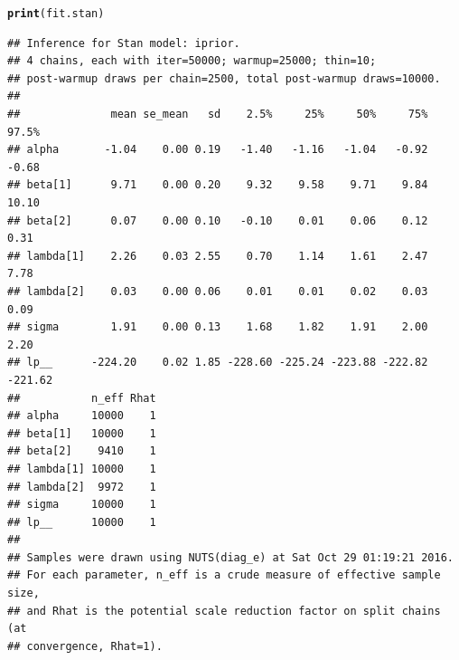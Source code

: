 \documentclass[]{beamer}\usepackage[]{graphicx}\usepackage[]{color}
\makeatletter
\newcommand{\hlstd}[1]{\textcolor[rgb]{0.345,0.345,0.345}{#1}}%
\newcommand{\hlkwd}[1]{\textcolor[rgb]{0.737,0.353,0.396}{\textbf{#1}}}%
\newenvironment{kframe}{%
 \def\at@end@of@kframe{}%
 \ifinner\ifhmode%
  \def\at@end@of@kframe{\end{minipage}}%
  \begin{minipage}{\columnwidth}%
 \fi\fi%
 \def\FrameCommand##1{\hskip\@totalleftmargin \hskip-\fboxsep
 \colorbox{shadecolor}{##1}\hskip-\fboxsep
     \hskip-\linewidth \hskip-\@totalleftmargin \hskip\columnwidth}%
 \MakeFramed {\advance\hsize-\width
   \@totalleftmargin\z@ \linewidth\hsize
   \@setminipage}}%
 {\par\unskip\endMakeFramed%
 \at@end@of@kframe}
\newenvironment{knitrout}{}{} %
\makeatother
\begin{document}
\newsavebox{\stanres}
\begin{lrbox}{\stanres}
\begin{knitrout}\footnotesize
{}\color{fgcolor}\begin{kframe}
\begin{alltt}
\hlkwd{print}\hlstd{(fit.stan)}
\end{alltt}
\begin{verbatim}
## Inference for Stan model: iprior.
## 4 chains, each with iter=50000; warmup=25000; thin=10; 
## post-warmup draws per chain=2500, total post-warmup draws=10000.
## 
##              mean se_mean   sd    2.5%     25%     50%     75%   97.5%
## alpha       -1.04    0.00 0.19   -1.40   -1.16   -1.04   -0.92   -0.68
## beta[1]      9.71    0.00 0.20    9.32    9.58    9.71    9.84   10.10
## beta[2]      0.07    0.00 0.10   -0.10    0.01    0.06    0.12    0.31
## lambda[1]    2.26    0.03 2.55    0.70    1.14    1.61    2.47    7.78
## lambda[2]    0.03    0.00 0.06    0.01    0.01    0.02    0.03    0.09
## sigma        1.91    0.00 0.13    1.68    1.82    1.91    2.00    2.20
## lp__      -224.20    0.02 1.85 -228.60 -225.24 -223.88 -222.82 -221.62
##           n_eff Rhat
## alpha     10000    1
## beta[1]   10000    1
## beta[2]    9410    1
## lambda[1] 10000    1
## lambda[2]  9972    1
## sigma     10000    1
## lp__      10000    1
## 
## Samples were drawn using NUTS(diag_e) at Sat Oct 29 01:19:21 2016.
## For each parameter, n_eff is a crude measure of effective sample size,
## and Rhat is the potential scale reduction factor on split chains (at 
## convergence, Rhat=1).
\end{verbatim}
\end{kframe}
\end{knitrout}
\end{lrbox}
\end{document}
